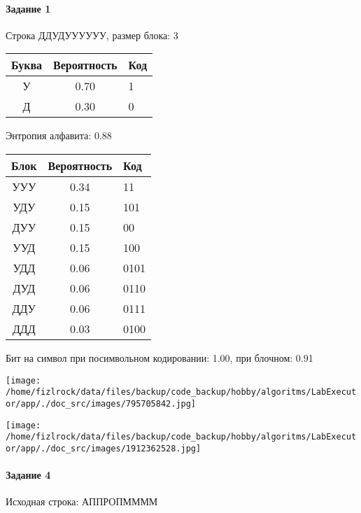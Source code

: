 \documentclass[a4paper, 12pt]{article}
\begin{document}
\paragraph{Задание 1}

Строка ДДУДУУУУУУ, размер блока: 3
\begin{center}
 \begin{tabular}{ |c|c|l| } 
  \hline
     Буква & Вероятность & Код\\ \hline
У & 0.70 & 1\\\hline
Д & 0.30 & 0
\\ \hline \end{tabular}
\end{center}
Энтропия алфавита: 0.88
\begin{center}
 \begin{tabular}{ |c|c|l| } 
  \hline
     Блок & Вероятность & Код\\ \hline
УУУ & 0.34 & 11\\\hline
УДУ & 0.15 & 101\\\hline
ДУУ & 0.15 & 00\\\hline
УУД & 0.15 & 100\\\hline
УДД & 0.06 & 0101\\\hline
ДУД & 0.06 & 0110\\\hline
ДДУ & 0.06 & 0111\\\hline
ДДД & 0.03 & 0100
\\ \hline \end{tabular}
\end{center}
Бит на символ при посимвольном кодировании: 1.00, при блочном: 0.91

\texttt{[image: /home/fizlrock/data/files/backup/code\_backup/hobby/algoritms/LabExecutor/app/./doc\_src/images/795705842.jpg]}

\texttt{[image: /home/fizlrock/data/files/backup/code\_backup/hobby/algoritms/LabExecutor/app/./doc\_src/images/1912362528.jpg]}
\paragraph{Задание 4}


Исходная строка: АППРОПММММ
\end{document}
